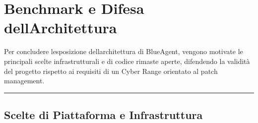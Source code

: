\section{Benchmark e Difesa
dell\textquotesingle Architettura}\label{benchmark-e-difesa-dellarchitettura}

Per concludere l\textquotesingle esposizione
dell\textquotesingle architettura di BlueAgent, vengono motivate le
principali scelte infrastrutturali e di codice rimaste aperte,
difendendo la validità del progetto rispetto ai requisiti di un Cyber
Range orientato al patch management.

\begin{center}\rule{0.5\linewidth}{0.5pt}\end{center}

\subsection{Scelte di Piattaforma e
Infrastruttura}\label{scelte-di-piattaforma-e-infrastruttura}

